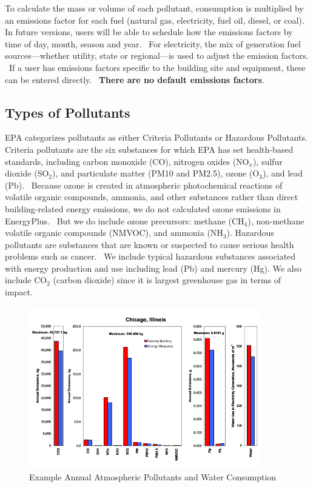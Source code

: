 To calculate the mass or volume of each pollutant, consumption is multiplied by an emissions factor for each fuel (natural gas, electricity, fuel oil, diesel, or coal). In future versions, users will be able to schedule how the emissions factors by time of day, month, season and year.~ For electricity, the mix of generation fuel sources---whether utility, state or regional---is used to adjust the emission factors. ~If a user has emissions factors specific to the building site and equipment, these can be entered directly.~ \textbf{There are no default emissions factors}.

\subsection{Types of Pollutants}\label{types-of-pollutants}

EPA categorizes pollutants as either Criteria Pollutants or Hazardous Pollutants. Criteria pollutants are the six substances for which EPA has set health-based standards, including carbon monoxide (CO), nitrogen oxides (NO\(_{x}\)), sulfur dioxide (SO\(_{2}\)), and particulate matter (PM10 and PM2.5), ozone (O\(_{3}\)), and lead (Pb).~ Because ozone is created in atmospheric photochemical reactions of volatile organic compounds, ammonia, and other substances rather than direct building-related energy emissions, we do not calculated ozone emissions in EnergyPlus.~ But we do include ozone precursors: methane (CH\(_{4}\)), non-methane volatile organic compounds (NMVOC), and ammonia (NH\(_{3}\)). Hazardous pollutants are substances that are known or suspected to cause serious health problems such as cancer.~ We include typical hazardous substances associated with energy production and use including lead (Pb) and mercury (Hg). We also include CO\(_{2}\) (carbon dioxide) since it is largest greenhouse gas in terms of impact.

\begin{figure}[hbtp] %
\centering
\includegraphics[width=0.9\textwidth, height=0.9\textheight, keepaspectratio=true]{media/image7910.svg.png}
\caption{Example Annual Atmospheric Pollutants and Water Consumption \protect \label{fig:example-annual-atmospheric-pollutants}}
\end{figure}

